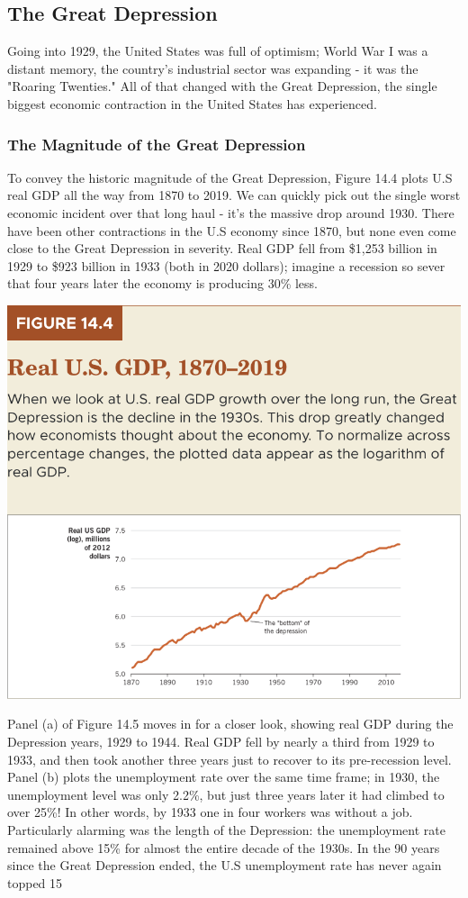 \documentclass[11pt]{article} %
\begin{document}
\subsection*{The Great Depression}
Going into 1929, the United States was full of optimism; World War I was a distant memory, the country's industrial sector was expanding - it was the "Roaring Twenties." All of that changed with the Great Depression, the single biggest economic contraction in the United States has experienced.
\subsubsection*{The Magnitude of the Great Depression}
To convey the historic magnitude of the Great Depression, Figure 14.4 plots U.S real GDP all the way from 1870 to 2019. We can quickly pick out the single worst economic incident over that long haul - it's the massive drop around 1930. There have been other contractions in the U.S economy since 1870, but none even come close to the Great Depression in severity. Real GDP fell from \$1,253 billion in 1929 to \$923 billion in 1933 (both in 2020 dollars); imagine a recession so sever that four years later the economy is producing 30\% less.

\begin{center}
\includegraphics[scale=0.5]{images/Figure 14.4.png}
\end{center}
Panel (a) of Figure 14.5 moves in for a closer look, showing real GDP during the Depression years, 1929 to 1944. Real GDP fell by nearly a third from 1929 to 1933, and then took another three years just to recover to its pre-recession level. Panel (b) plots the unemployment rate over the same time frame; in 1930, the unemployment level was only 2.2\%, but just three years later it had climbed to over 25\%! In other words, by 1933 one in four workers was without a job. Particularly alarming was the length of the Depression: the unemployment rate remained above 15\% for almost the entire decade of the 1930s. In the 90 years since the Great Depression ended, the U.S unemployment rate has never again topped 15%
\end{document}
